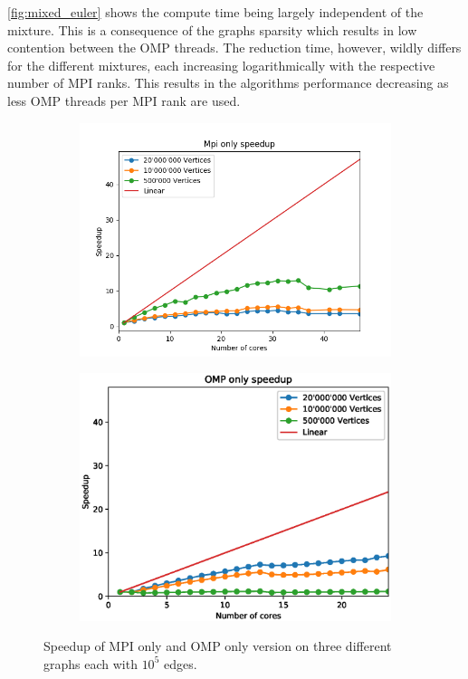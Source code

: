 \autoref{fig:mixed_euler} shows the compute time being largely independent of the mixture. This is a consequence of the graphs sparsity which results in low contention between the OMP threads. The reduction time, however, wildly differs for the different mixtures, each increasing logarithmically with the respective number of MPI ranks. This results in the algorithms performance decreasing as less OMP threads per MPI rank are used.


\begin{figure}
\begin{subfigure}[c]{0.23\textwidth}
\includegraphics[width=\textwidth]{plots/mpi_speedup_with_ref}
\label{fig:speedup_mpi}
\end{subfigure}
\begin{subfigure}[c]{0.23\textwidth}
\includegraphics[width=\textwidth]{plots/omp_speedup_with_ref}
\label{fig:speedup_omp}
\end{subfigure}
\caption{Speedup of MPI only and OMP only version on three different graphs each with $10^{5}$ edges.}
\label{fig:speedup}
\end{figure}

